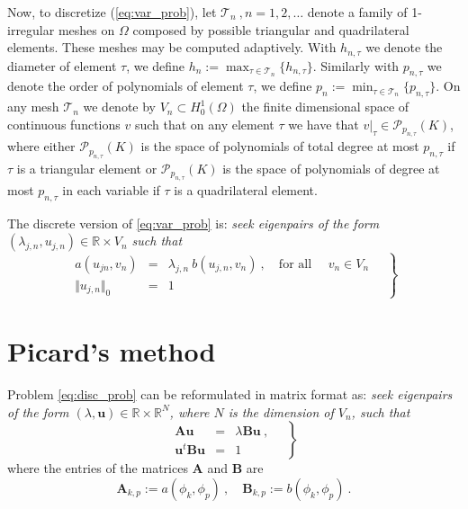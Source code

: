 \documentclass[preprint ,12pt]{elsarticle}
\newcommand{\cT}{\mathcal{T}}
\begin{document}
Now, to discretize (\ref{eq:var_prob}), let $\cT_n\ , n =
1,2,\ldots $ denote a family of 1-irregular meshes on $\Omega$ composed by possible triangular and quadrilateral elements. 
These meshes may be computed adaptively. 
With  $h_{n,\tau}$ we denote  the diameter of element $\tau$,  
we define
$
h_n:=\max_{\tau\in \mathcal{T}_n}\{h_{n,\tau}\}.
$
Similarly with  $p_{n,\tau}$ we denote  the order of polynomials of element $\tau$,  
we define
$
p_n:=\min_{\tau\in \mathcal{T}_n}\{p_{n,\tau}\}.
$
On any mesh $\mathcal{T}_n$ we denote by $V_n \subset H^1_0(\Omega)$ the finite
dimensional space of continuous functions $v$ such that on any element $\tau$ we have that 
$v|_\tau\in \mathcal{P}_{p_{n,\tau}}(K)$, where either $\mathcal{P}_{p_{n,\tau}}(K)$ is the space of polynomials of total degree at most $p_{n,\tau}$ if $\tau$ is a triangular element or $\mathcal{P}_{p_{n,\tau}}(K)$ is the space of polynomials of degree at most $p_{n,\tau}$ in each variable if $\tau$ is a quadrilateral element.



The discrete version of \eqref{eq:var_prob} is:
\emph{seek eigenpairs of the form $(\lambda_{j,n},u_{j,n})\in
\mathbb{R}\times V_n$
such that}
\begin{equation}
\label{eq:disc_prob}
\left.
\begin{array}{lcl}
a(u_{jn},v_{n})&=& \lambda_{j,n}\ b(u_{j,n},v_{n})\ ,
\quad \text{for all } \quad v_{n}  \in V_n\\
 \Vert u_{j,n} \Vert_{0} &=& 1
\end{array}\quad
\right\}
\end{equation}


\section{Picard's method}

Problem \eqref{eq:disc_prob} can be reformulated in matrix format as:
\emph{seek eigenpairs of the form $(\lambda,\mathbf{u})\in
\mathbb{R}\times \mathbb{R}^N$, where $N$ is the dimension of $V_n$,
such that}
\begin{equation}
\label{eq:disc_prob_mat}
\left.
\begin{array}{lcl}
\mathbf{A} \mathbf{u}&=& \lambda\mathbf{B}\mathbf{u}\ ,
\\
\mathbf{u}^t\mathbf{B} \mathbf{u} &=& 1
\end{array}\quad
\right\}
\end{equation}
where the entries of the matrices $\mathbf{A}$ and $\mathbf{B}$ are 
$$
\mathbf{A}_{k,p}:=a(\phi_k,\phi_p)\ ,\quad\mathbf{B}_{k,p}:=b(\phi_k,\phi_p)\ .
$$
\end{document}
